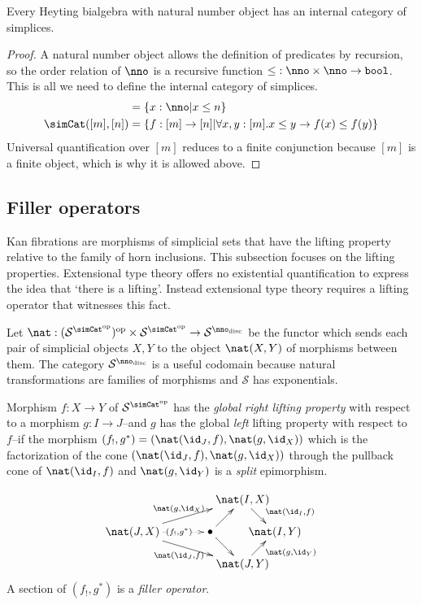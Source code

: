 \documentclass{tac}
\newcommand\hide[1]{}
\newcommand\cat\mathcal
\newcommand\set[1]{\left\{#1\right\}}
\newcommand\ri{^*}
\newcommand\dual{^{\mathrm{op}}}
\newcommand\disc{_{\mathrm{disc}}}
\newcommand\s{^{\simCat\dual}}
\newcommand\bang{!}
\newcommand\of{:}
\newcommand\bool{\mathtt{bool}}
\begin{document}
\begin{proposition} Every Heyting bialgebra with natural number object has an internal category of simplices.\end{proposition}

\begin{proof} A natural number object allows the definition of predicates by recursion, so the order relation of $\nno$ is a recursive function $\mathord\leq\of\nno\times \nno \to \bool$. This is all we need to define the internal category of simplices.
\begin{align*}
[n] &= \set{x\of\nno\middle| x\leq n}\\
\simCat([m],[n]) &= \set{f\of[m]\to[n]\middle|\forall x,y\of [m].x\leq y\to f(x)\leq f(y)}
\end{align*}
Universal quantification over $[m]$ reduces to a finite conjunction because $[m]$ is a finite object, which is why it is allowed above. 
\end{proof}

\subsection{Filler operators}
Kan fibrations are morphisms of simplicial sets that have the lifting property relative to the family of horn inclusions. This subsection focuses on the lifting properties. Extensional type theory offers no existential quantification to express the idea that `there is a lifting'. Instead extensional type theory requires a lifting operator that witnesses this fact.

\begin{definition} Let $\nat\of(\cat S\s)\dual\times \cat S\s \to \cat S^{\nno\disc}$ be the functor which sends each pair of simplicial objects $X,Y$ to the object $\nat(X,Y)$ of morphisms between them. The category $\cat S^{\nno\disc}$ is a useful codomain because natural transformations are families of morphisms and $\cat S$ has exponentials.

Morphism $f\of X\to Y$ of $\cat S\s$ has the \emph{global right lifting property} with respect to a morphism $g\of I\to J$--and $g$ has the global \emph{left} lifting property with respect to $f$--if the morphism $(f_!,g\ri) = (\nat(\id_J,f),\nat(g,\id_X))$ 
which is the factorization of the cone $(\nat(\id_J,f),\nat(g,\id_X))$ through the pullback cone of $\nat(\id_I,f)$ and $\nat(g,\id_Y)$
is a \emph{split} epimorphism.
\hide{\[\xymatrix{ 
\nat(J,X) \ar@/^2ex/[rrr]^{\nat(g,\id_X)} \ar[dr]_(.6){\nat(\id_J,f)} \ar[r]_{(f_!,g\ri)}
& \bullet \ar[d]\ar[rr] && \nat(I,X) \ar[d]^{\nat(\id_I,f)}\\
& \nat(J,Y) \ar[rr]_{\nat(g,\id_Y)} && \nat(I,Y)
}\]}
\[\xy
(34,20)*+{\nat(I,X)}="top",(0,10)*+{\nat(J,X)}="left",(24,10)*+{\bullet}="middle",(44,10)*+{\nat(I,Y)}="right",(34,0)*+{\nat(J,Y)}="bottom"
\ar^{\nat(g,\id_X)} "left";"top" \ar@{.>}|(.6){(f_!,g\ri)} "left";"middle" \ar_{\nat(\id_J,f)} "left";"bottom" \ar "middle";"bottom"
\ar "middle";"top" \ar^(.6){\nat(\id_I,f)} "top";"right" \ar_(.6){\nat(g,\id_Y)} "bottom";"right"
\endxy\]
A section of $(f_\bang,g\ri)$ is a \emph{filler operator}.\label{lifting}
\end{definition}
\end{document}
